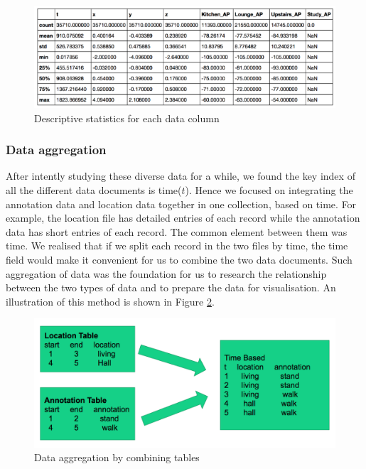 \documentclass[fleqn,10pt]{SelfArx} %
\begin{document}
\begin{figure}[!h] \centering
	\includegraphics[scale=0.6]{desc-stats} 
	\caption{Descriptive statistics for each data column}
	\label{fig:md-stats}
\end{figure}

\subsubsection{Data aggregation}
After intently studying these diverse data for a while, we found the key index of all the different data documents is time($t$). Hence we focused on integrating the annotation data and location data together in one collection, based on time. For example, the location file has detailed entries of each record while the annotation data has short entries of each record. The common element between them was time. We realised that if we split each record in the two files by time, the time field would make it convenient for us to combine the two data documents. Such aggregation of data was the foundation for us to research the relationship between the two types of data and to prepare the data for visualisation. An illustration of this method is shown in Figure \ref{fig:data-agg}. \\

\begin{figure}[!h] \centering
	\includegraphics[scale=0.2]{data-agg1} 
	\caption{Data aggregation by combining tables}
	\label{fig:data-agg}
\end{figure}
\end{document}
